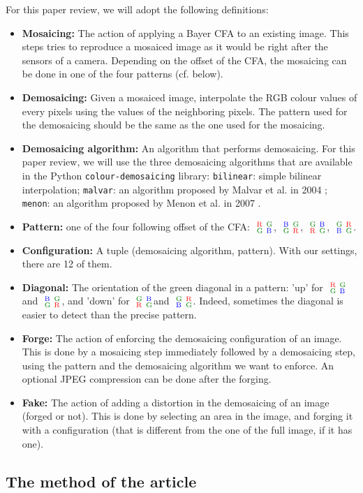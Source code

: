 \documentclass[sigconf, nonacm]{acmart}
\newcommand{\RGGB}{$
~^{\text{\color{red}R}}_{\text{\color{darkgreen}G}}
~^{\text{\color{darkgreen}G}}_{\text{\color{darkblue}B}}
$}
\newcommand{\BGGR}{$
~^{\text{\color{darkblue}B}}_{\text{\color{darkgreen}G}}
~^{\text{\color{darkgreen}G}}_{\text{\color{red}R}}
$}
\newcommand{\GRBG}{$
~^{\text{\color{darkgreen}G}}_{\text{\color{darkblue}B}}
~^{\text{\color{red}R}}_{\text{\color{darkgreen}G}}
$}
\newcommand{\GBRG}{$
~^{\text{\color{darkgreen}G}}_{\text{\color{red}R}}
~^{\text{\color{darkblue}B}}_{\text{\color{darkgreen}G}}
$}
\begin{document}
For this paper review, we will adopt the following definitions:
\begin{itemize}
    \item \textbf{Mosaicing:} The action of applying a Bayer CFA to an existing image. This steps tries to reproduce a mosaiced image as it would be right after the sensors of a camera. Depending on the offset of the CFA, the mosaicing can be done in one of the four patterns (cf. below).
    \item \textbf{Demosaicing:} Given a mosaiced image, interpolate the RGB colour values of every pixels using the values of the neighboring pixels. The pattern used for the demosaicing should be the same as the one used for the mosaicing.
    \item \textbf{Demosaicing algorithm:} An algorithm that performs demosaicing. For this paper review, we will use the three demosaicing algorithms that are available in the Python \texttt{colour-demosaicing} library: \texttt{bilinear}: simple bilinear interpolation; \texttt{malvar}: an algorithm proposed by Malvar et al. in 2004 \cite{malvar_high-quality_2004}; \texttt{menon}: an algorithm proposed by Menon et al. in 2007 \cite{menon_demosaicing_2007}.
    \item \textbf{Pattern:} one of the four following offset of the CFA: \RGGB, \BGGR, \GBRG, \GRBG.
    \item \textbf{Configuration:} A tuple (demosaicing algorithm, pattern). With our settings, there are 12 of them.
    \item \textbf{Diagonal:} The orientation of the green diagonal in a pattern: 'up' for \RGGB and \BGGR, and 'down' for \GBRG and \GRBG. Indeed, sometimes the diagonal is easier to detect than the precise pattern.
    \item \textbf{Forge:} The action of enforcing the demosaicing configuration of an image. This is done by a mosaicing step immediately followed by a demosaicing step, using the pattern and the demosaicing algorithm we want to enforce. An optional JPEG compression can be done after the forging.
    \item \textbf{Fake:} The action of adding a distortion in the demosaicing of an image (forged or not). This is done by selecting an area in the image, and forging it with a configuration (that is different from the one of the full image, if it has one).
\end{itemize}

\subsection{The method of the article} \label{sec:article_method}
\end{document}
